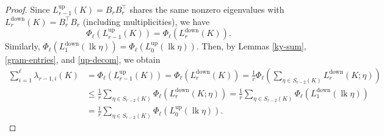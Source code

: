 \documentclass[12pt]{amsart}
\theoremstyle{plain}
\theoremstyle{definition}
\numberwithin{equation}{section}
\numberwithin{figure}{section}
\newcommand{\Ldown}{L^{\operatorname{down}}}
\newcommand{\Lup}{L^{\operatorname{up}}}
\newcommand{\lk}{\operatorname{lk}}
\begin{document}
\begin{proof}
Since $\Lup_{r - 1}(K) = B_r B_r^\top$ shares the same nonzero eigenvalues with $\Ldown_r(K)=B_r^\top B_r$ (including multiplicities), we have
\[
\Phi_\ell\left(\Lup_{r - 1}(K)\right)
=
\Phi_\ell(\Ldown_r(K)).
\]
Similarly, $\Phi_\ell(\Ldown_1(\lk \eta))=\Phi_\ell(\Lup_0(\lk \eta))$.
Then, by Lemmas \ref{ky-sum}, \ref{gram-entries}, and \ref{up-decom}, we obtain
\[
\begin{aligned}
\sum_{i = 1}^\ell \lambda_{r-1,i}(K)
&= \Phi_\ell\left(\Lup_{r - 1}(K)\right) = \Phi_\ell(\Ldown_r(K))
= \frac{1}{r}
\Phi_\ell\left(
\sum_{\eta \in S_{r - 2}(K)}
\Ldown_r(K;\eta)
\right) \\
&\leq \frac{1}{r}
\sum_{\eta \in S_{r - 2}(K)}
\Phi_\ell(\Ldown_r(K;\eta))
=
\frac{1}{r}\sum_{\eta \in S_{r - 2}(K)}\Phi_\ell(\Ldown_1(\lk \eta))\\
&=\frac{1}{r}\sum_{\eta \in S_{r - 2}(K)}\Phi_\ell(\Lup_0(\lk \eta)).
\end{aligned}
\]
\end{proof}
\end{document}
